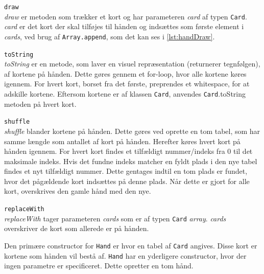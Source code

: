 \documentclass[a4paper]{article}
\newcommand{\namedref}[1]{\autoref{#1}} %
\begin{document}
\begin{description}
\begin{description}
          \item{{\texttt{draw}}}~\\
            \textit{draw} er metoden som trækker et kort og har parameteren \textit{card} 
            af typen \texttt{Card}. \textit{card} er det kort der skal tilføjes til hånden og indsættes 
            som første element i \textit{cards}, ved brug af \lstinline$Array.append$, som det kan ses i \namedref{lst:handDraw}.
            
            
            
          \item{{\texttt{toString}}}~\\
            \textit{toString} er en metode, som laver en visuel repræsentation (returnerer tegnfølgen),
            af kortene på hånden. Dette gøres gennem et for-loop, hvor alle kortene køres igennem.
            For hvert kort, borset fra det første, preprendes et whitespace, for at adskille kortene.
            Eftersom kortene er af klassen \texttt{Card}, anvendes \texttt{Card}.toString metoden på 
            hvert kort.
            
          \item{{\texttt{shuffle}}}~\\
          \textit{shuffle} blander kortene på hånden. Dette gøres ved oprette en tom tabel, som har 
          samme længde som antallet af kort på hånden. Herefter køres hvert kort på hånden igennem. For 
          hvert kort findes et tilfældigt nummer/indeks fra 0 til det maksimale indeks. Hvis det fundne 
          indeks matcher en fyldt plads i den nye tabel findes et nyt tilfældigt nummer. Dette gentages  
          indtil en tom plads er fundet, hvor det pågældende kort indsættes på denne plads.
          Når dette er gjort for alle kort, overskrives den gamle hånd med den nye.
          
          \item{{\texttt{replaceWith}}}~\\
          \textit{replaceWith} tager parameteren \textit{cards} som er af typen \texttt{Card} 
          \textit{array}. \textit{cards} overskriver de kort som allerede er på hånden.
          
        \end{description}
        
        Den primære constructor for \texttt{Hand} er hvor en tabel af \texttt{Card} angives. Disse kort 
        er kortene som hånden vil bestå af. \texttt{Hand} har en yderligere constructor, hvor der ingen 
        parametre er specificeret. Dette opretter en tom hånd. 
                

\end{description}
\end{document}
